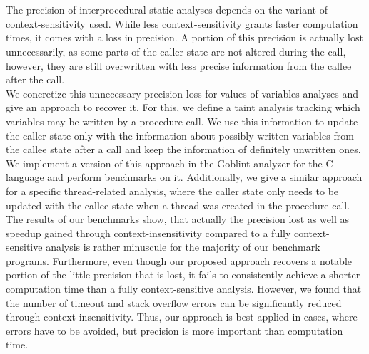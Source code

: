 \chapter{\abstractname}

The precision of interprocedural static analyses depends on the variant of context-sensitivity used. While less context-sensitivity grants faster computation times, it comes with a loss in precision. A portion of this precision is actually lost unnecessarily, as some parts of the caller state are not altered during the call, however, they are still overwritten with less precise information from the callee after the call.\\
We concretize this unnecessary precision loss for values-of-variables analyses and give an approach to recover it. For this, we define a taint analysis tracking which variables may be written by a procedure call. We use this information to update the caller state only with the information about possibly written variables from the callee state after a call and keep the information of definitely unwritten ones. We implement a version of this approach in the Goblint analyzer for the C language and perform benchmarks on it. Additionally, we give a similar approach for a specific thread-related analysis, where the caller state only needs to be updated with the callee state when a thread was created in the procedure call.\\
The results of our benchmarks show, that actually the precision lost as well as speedup gained through context-insensitivity compared to a fully context-sensitive analysis is rather minuscule for the majority of our benchmark programs. Furthermore, even though our proposed approach recovers a notable portion of the little precision that is lost, it fails to consistently achieve a shorter computation time than a fully context-sensitive analysis. However, we found that the number of timeout and stack overflow errors can be significantly reduced through context-insensitivity. Thus, our approach is best applied in cases, where errors have to be avoided, but precision is more important than computation time. %